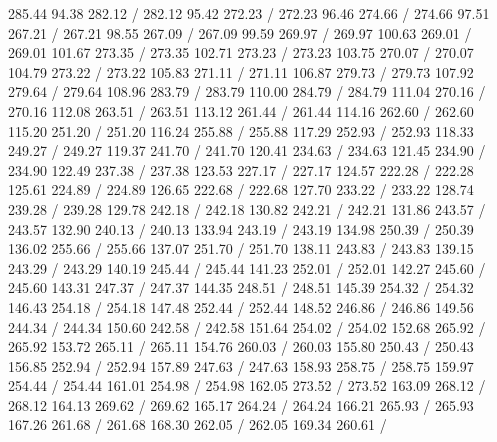 { 285.44 94.38 282.12 /
 282.12 95.42 272.23 /
 272.23 96.46 274.66 /
 274.66 97.51 267.21 /
 267.21 98.55 267.09 /
 267.09 99.59 269.97 /
 269.97 100.63 269.01 /
 269.01 101.67 273.35 /
 273.35 102.71 273.23 /
 273.23 103.75 270.07 /
 270.07 104.79 273.22 /
 273.22 105.83 271.11 /
 271.11 106.87 279.73 /
 279.73 107.92 279.64 /
 279.64 108.96 283.79 /
 283.79 110.00 284.79 /
 284.79 111.04 270.16 /
 270.16 112.08 263.51 /
 263.51 113.12 261.44 /
 261.44 114.16 262.60 /
 262.60 115.20 251.20 /
 251.20 116.24 255.88 /
 255.88 117.29 252.93 /
 252.93 118.33 249.27 /
 249.27 119.37 241.70 /
 241.70 120.41 234.63 /
 234.63 121.45 234.90 /
 234.90 122.49 237.38 /
 237.38 123.53 227.17 /
 227.17 124.57 222.28 /
 222.28 125.61 224.89 /
 224.89 126.65 222.68 /
 222.68 127.70 233.22 /
 233.22 128.74 239.28 /
 239.28 129.78 242.18 /
 242.18 130.82 242.21 /
 242.21 131.86 243.57 /
 243.57 132.90 240.13 /
 240.13 133.94 243.19 /
 243.19 134.98 250.39 /
 250.39 136.02 255.66 /
 255.66 137.07 251.70 /
 251.70 138.11 243.83 /
 243.83 139.15 243.29 /
 243.29 140.19 245.44 /
 245.44 141.23 252.01 /
 252.01 142.27 245.60 /
 245.60 143.31 247.37 /
 247.37 144.35 248.51 /
 248.51 145.39 254.32 /
 254.32 146.43 254.18 /
 254.18 147.48 252.44 /
 252.44 148.52 246.86 /
 246.86 149.56 244.34 /
 244.34 150.60 242.58 /
 242.58 151.64 254.02 /
 254.02 152.68 265.92 /
 265.92 153.72 265.11 /
 265.11 154.76 260.03 /
 260.03 155.80 250.43 /
 250.43 156.85 252.94 /
 252.94 157.89 247.63 /
 247.63 158.93 258.75 /
 258.75 159.97 254.44 /
 254.44 161.01 254.98 /
 254.98 162.05 273.52 /
 273.52 163.09 268.12 /
 268.12 164.13 269.62 /
 269.62 165.17 264.24 /
 264.24 166.21 265.93 /
 265.93 167.26 261.68 /
 261.68 168.30 262.05 /
 262.05 169.34 260.61 /
}
